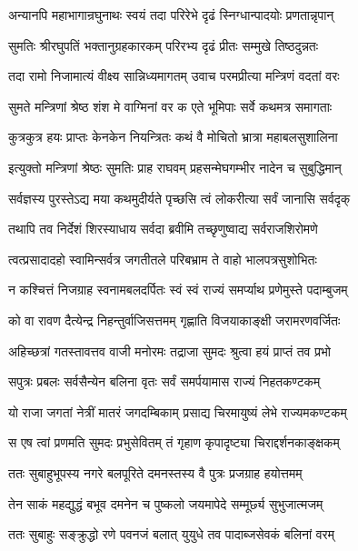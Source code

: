 \twolineshloka
{अन्यानपि महाभागान्रघुनाथः स्वयं तदा}
{परिरेभे दृढं स्निग्धान्पादयोः प्रणतान्नृपान्}%

\twolineshloka
{सुमतिः श्रीरघुपतिं भक्तानुग्रहकारकम्}
{परिरभ्य दृढं प्रीतः सम्मुखे तिष्ठदुन्नतः}%

\twolineshloka
{तदा रामो निजामात्यं वीक्ष्य सान्निध्यमागतम्}
{उवाच परमप्रीत्या मन्त्रिणं वदतां वरः}%

\twolineshloka
{सुमते मन्त्रिणां श्रेष्ठ शंश मे वाग्मिनां वर}
{क एते भूमिपाः सर्वे कथमत्र समागताः}%

\twolineshloka
{कुत्रकुत्र हयः प्राप्तः केनकेन नियन्त्रितः}
{कथं वै मोचितो भ्रात्रा महाबलसुशालिना}%


\twolineshloka
{इत्युक्तो मन्त्रिणां श्रेष्ठः सुमतिः प्राह राघवम्}
{प्रहसन्मेघगम्भीर नादेन च सुबुद्धिमान्}%


\twolineshloka
{सर्वज्ञस्य पुरस्तेऽद्य मया कथमुदीर्यते}
{पृच्छसि त्वं लोकरीत्या सर्वं जानासि सर्वदृक्}%

\twolineshloka
{तथापि तव निर्देशं शिरस्याधाय सर्वदा}
{ब्रवीमि तच्छृणुष्वाद्य सर्वराजशिरोमणे}%

\twolineshloka
{त्वत्प्रसादादहो स्वामिन्सर्वत्र जगतीतले}
{परिबभ्राम ते वाहो भालपत्रसुशोभितः}%

\twolineshloka
{न कश्चित्तं निजग्राह स्वनामबलदर्पितः}
{स्वं स्वं राज्यं समर्प्याथ प्रणेमुस्ते पदाम्बुजम्}%

\twolineshloka
{को वा रावण दैत्येन्द्र निहन्तुर्वाजिसत्तमम्}
{गृह्णाति विजयाकाङ्क्षी जरामरणवर्जितः}%

\twolineshloka
{अहिच्छत्रां गतस्तावत्तव वाजी मनोरमः}
{तद्राजा सुमदः श्रुत्वा हयं प्राप्तं तव प्रभो}%

\twolineshloka
{सपुत्रः प्रबलः सर्वसैन्येन बलिना वृतः}
{सर्वं समर्पयामास राज्यं निहतकण्टकम्}%

\twolineshloka
{यो राजा जगतां नेत्रीं मातरं जगदम्बिकाम्}
{प्रसाद्य चिरमायुष्यं लेभे राज्यमकण्टकम्}%

\twolineshloka
{स एष त्वां प्रणमति सुमदः प्रभुसेवितम्}
{तं गृहाण कृपादृष्ट्या चिराद्दर्शनकाङ्क्षकम्}%

\twolineshloka
{ततः सुबाहुभूपस्य नगरे बलपूरिते}
{दमनस्तस्य वै पुत्रः प्रजग्राह हयोत्तमम्}%

\twolineshloka
{तेन साकं महद्युद्धं बभूव दमनेन च}
{पुष्कलो जयमापेदे सम्मूर्छ्य सुभुजात्मजम्}%

\twolineshloka
{ततः सुबाहुः सङ्क्रुद्धो रणे पवनजं बलात्}
{युयुधे तव पादाब्जसेवकं बलिनां वरम्}%

